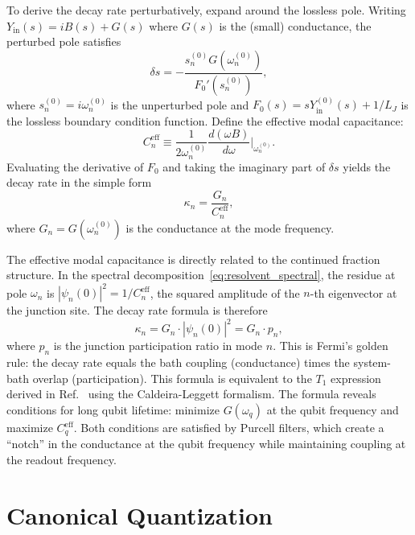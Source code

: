 \documentclass[reprint, floatfix, superscriptaddress, amsmath, amssymb, longbibliography]{revtex4-2}
\begin{document}
To derive the decay rate perturbatively, expand around the lossless pole. Writing $Y_{\mathrm{in}}(s) = iB(s) + G(s)$ where $G(s)$ is the (small) conductance, the perturbed pole satisfies
\begin{equation}
\delta s = -\frac{s_n^{(0)} G(\omega_n^{(0)})}{F_0'(s_n^{(0)})},
\label{eq:delta_s}
\end{equation}
where $s_n^{(0)} = i\omega_n^{(0)}$ is the unperturbed pole and $F_0(s) = sY_{\mathrm{in}}^{(0)}(s) + 1/L_J$ is the lossless boundary condition function. Define the effective modal capacitance:
\begin{equation}
C_n^{\mathrm{eff}} \equiv \frac{1}{2\omega_n^{(0)}} \frac{d(\omega B)}{d\omega}\bigg|_{\omega_n^{(0)}}.
\label{eq:Ceff_def}
\end{equation}
Evaluating the derivative of $F_0$ and taking the imaginary part of $\delta s$ yields the decay rate in the simple form
\begin{equation}
\kappa_n = \frac{G_n}{C_n^{\mathrm{eff}}},
\label{eq:kappa_final}
\end{equation}
where $G_n = G(\omega_n^{(0)})$ is the conductance at the mode frequency.

The effective modal capacitance is directly related to the continued fraction structure. In the spectral decomposition~\eqref{eq:resolvent_spectral}, the residue at pole $\omega_n$ is $|\psi_n(0)|^2 = 1/C_n^{\mathrm{eff}}$, the squared amplitude of the $n$-th eigenvector at the junction site. The decay rate formula is therefore
\begin{equation}
\kappa_n = G_n \cdot |\psi_n(0)|^2 = G_n \cdot p_n,
\label{eq:kappa_participation}
\end{equation}
where $p_n$ is the junction participation ratio in mode $n$. This is Fermi's golden rule: the decay rate equals the bath coupling (conductance) times the system-bath overlap (participation). This formula is equivalent to the $T_1$ expression derived in Ref.~\cite{Solgun2014} using the Caldeira-Leggett formalism. The formula reveals conditions for long qubit lifetime: minimize $G(\omega_q)$ at the qubit frequency and maximize $C_q^{\mathrm{eff}}$. Both conditions are satisfied by Purcell filters, which create a ``notch'' in the conductance at the qubit frequency while maintaining coupling at the readout frequency.



\section{Canonical Quantization}
\label{sec:quantization}
\end{document}
